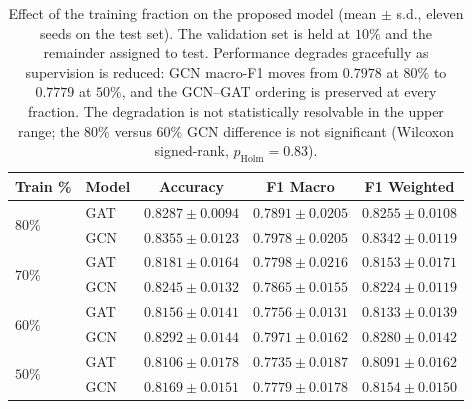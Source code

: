\documentclass[11pt]{article}
\begin{document}
\clearpage


\begin{table}[t]
\centering
\caption{Effect of the training fraction on the proposed model
(mean $\pm$ s.d., eleven seeds on the test set). The validation set is
held at $10\%$ and the remainder assigned to test. Performance degrades
gracefully as supervision is reduced: GCN macro-F1 moves from $0.7978$ at
$80\%$ to $0.7779$ at $50\%$, and the GCN--GAT ordering is preserved at
every fraction. The degradation is not statistically resolvable in the
upper range; the $80\%$ versus $60\%$ GCN difference is not significant
(Wilcoxon signed-rank, $p_{\text{Holm}} = 0.83$).}
\label{tab:splits_comparison}
\small
\setlength{\tabcolsep}{6pt}
\renewcommand{\arraystretch}{1.1}
\begin{tabular}{llccc}
\toprule
\textbf{Train \%} & \textbf{Model} & \textbf{Accuracy} & \textbf{F1 Macro} & \textbf{F1 Weighted} \\
\midrule
\multirow{2}{*}{$80\%$} & GAT & $0.8287 \pm 0.0094$ & $0.7891 \pm 0.0205$ & $0.8255 \pm 0.0108$ \\
                        & GCN & $0.8355 \pm 0.0123$ & $\mathbf{0.7978 \pm 0.0205}$ & $0.8342 \pm 0.0119$ \\
\midrule
\multirow{2}{*}{$70\%$} & GAT & $0.8181 \pm 0.0164$ & $0.7798 \pm 0.0216$ & $0.8153 \pm 0.0171$ \\
                        & GCN & $0.8245 \pm 0.0132$ & $0.7865 \pm 0.0155$ & $0.8224 \pm 0.0119$ \\
\midrule
\multirow{2}{*}{$60\%$} & GAT & $0.8156 \pm 0.0141$ & $0.7756 \pm 0.0131$ & $0.8133 \pm 0.0139$ \\
                        & GCN & $0.8292 \pm 0.0144$ & $0.7971 \pm 0.0162$ & $0.8280 \pm 0.0142$ \\
\midrule
\multirow{2}{*}{$50\%$} & GAT & $0.8106 \pm 0.0178$ & $0.7735 \pm 0.0187$ & $0.8091 \pm 0.0162$ \\
                        & GCN & $0.8169 \pm 0.0151$ & $0.7779 \pm 0.0178$ & $0.8154 \pm 0.0150$ \\
\bottomrule
\end{tabular}
\end{table}
\end{document}
